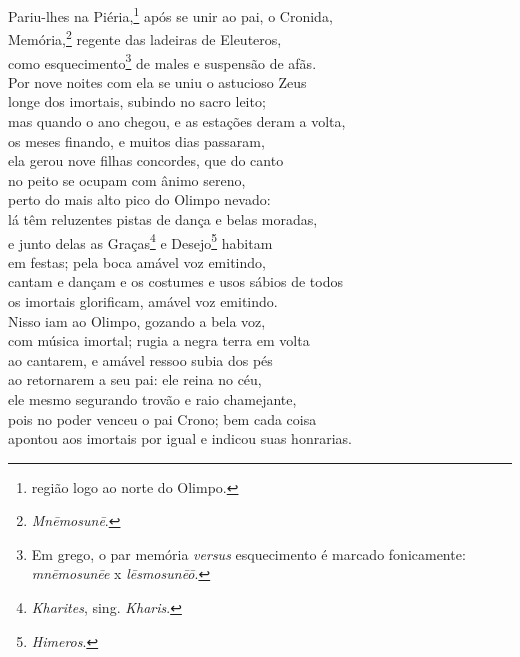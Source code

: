 \quad{}Pariu-lhes na Piéria,\footnote{região logo ao norte do Olimpo.} após se unir ao pai, o Cronida,\\
Memória,\footnote{\emph{Mnēmosunē}.} regente das ladeiras de Eleuteros,\\
como esquecimento\footnote{Em grego, o par memória \emph{versus} esquecimento é marcado fonicamente: \emph{mnēmosunēe} x \emph{lēsmosunēō}.} de males e suspensão de afãs. \\
Por nove noites com ela se uniu o astucioso Zeus\\
longe dos imortais, subindo no sacro leito;\\
mas quando o ano chegou, e as estações deram a volta,\\
os meses finando, e muitos dias passaram,\\
ela gerou nove filhas concordes, que do canto \\
no peito se ocupam com ânimo sereno,\\
perto do mais alto pico do Olimpo nevado:\\
lá têm reluzentes pistas de dança e belas moradas,\\
e junto delas as Graças\footnote{\emph{Kharites}, sing. \emph{Kharis}.} e Desejo\footnote{\emph{Himeros}.} habitam\\
em festas; pela boca amável voz emitindo, \\
cantam e dançam e os costumes e usos sábios de todos\\
os imortais glorificam, amável voz emitindo.\\
Nisso iam ao Olimpo, gozando a bela voz,\\
com música imortal; rugia a negra terra em volta\\
ao cantarem, e amável ressoo subia dos pés \\
ao retornarem a seu pai: ele reina no céu,\\
ele mesmo segurando trovão e raio chamejante,\\
pois no poder venceu o pai Crono; bem cada coisa\\
apontou aos imortais por igual e indicou suas honrarias.

